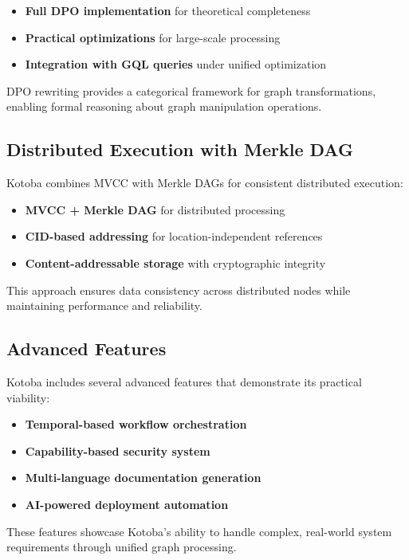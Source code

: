 \documentclass[11pt,a4paper]{article}
\begin{document}
\begin{itemize}
\item \textbf{Full DPO implementation} for theoretical completeness
\item \textbf{Practical optimizations} for large-scale processing
\item \textbf{Integration with GQL queries} under unified optimization
\end{itemize}

DPO rewriting provides a categorical framework for graph transformations, enabling formal reasoning about graph manipulation operations.

\subsection{Distributed Execution with Merkle DAG}
Kotoba combines MVCC with Merkle DAGs for consistent distributed execution:

\begin{itemize}
\item \textbf{MVCC + Merkle DAG} for distributed processing
\item \textbf{CID-based addressing} for location-independent references
\item \textbf{Content-addressable storage} with cryptographic integrity
\end{itemize}

This approach ensures data consistency across distributed nodes while maintaining performance and reliability.

\subsection{Advanced Features}
Kotoba includes several advanced features that demonstrate its practical viability:

\begin{itemize}
\item \textbf{Temporal-based workflow orchestration}
\item \textbf{Capability-based security system}
\item \textbf{Multi-language documentation generation}
\item \textbf{AI-powered deployment automation}
\end{itemize}

These features showcase Kotoba's ability to handle complex, real-world system requirements through unified graph processing.
\end{document}
